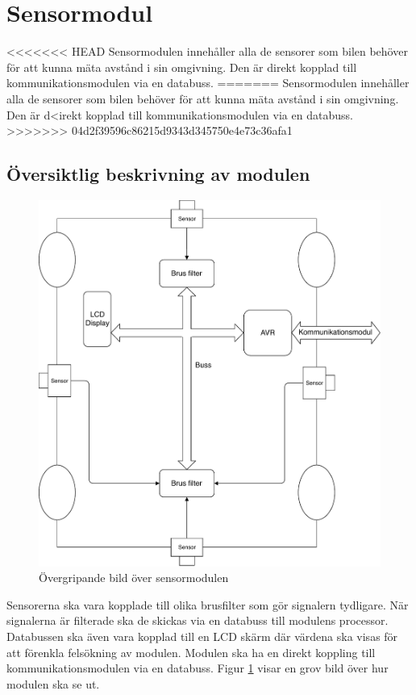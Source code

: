 \documentclass[systemskiss/skiss.tex]{subfiles}
\begin{document}
\section{Sensormodul}
<<<<<<< HEAD
Sensormodulen innehåller alla de sensorer som bilen behöver för att kunna mäta avstånd i sin omgivning. Den är direkt kopplad till kommunikationsmodulen via en databuss.
=======
Sensormodulen innehåller alla de sensorer som bilen behöver för att kunna mäta avstånd i sin omgivning. Den är d<irekt kopplad till kommunikationsmodulen via en databuss.
>>>>>>> 04d2f39596c86215d9343d345750e4e73c36afa1
\subsection{Översiktlig beskrivning av modulen}
\begin{figure}[h]
    \centering
    \includegraphics[width=0.6\linewidth]{systemskiss/figures/sensormodul.pdf}
    \caption{Övergripande bild över sensormodulen}
    \label{fig:sensorskiss}
\end{figure}

Sensorerna ska vara kopplade till olika brusfilter som gör signalern tydligare. När signalerna är filterade ska de skickas via en databuss till modulens processor. Databussen ska även vara kopplad till en LCD skärm där värdena ska visas för att förenkla felsökning av modulen. Modulen ska ha en direkt koppling till kommunikationsmodulen via en databuss. Figur \ref{fig:sensorskiss} visar en grov bild över hur modulen ska se ut.
\end{document}

